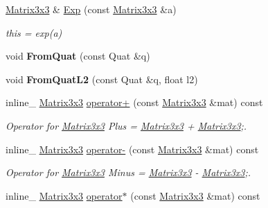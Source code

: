 \begin{DoxyCompactItemize}
\item 
\hypertarget{class_matrix3x3_a89f097e8a6c046d9b2a7c364f9a6dfbe}{\hyperlink{class_matrix3x3}{Matrix3x3} \& \hyperlink{class_matrix3x3_a89f097e8a6c046d9b2a7c364f9a6dfbe}{Exp} (const \hyperlink{class_matrix3x3}{Matrix3x3} \&a)}\label{class_matrix3x3_a89f097e8a6c046d9b2a7c364f9a6dfbe}

\begin{DoxyCompactList}\small\item\em this = exp(a) \end{DoxyCompactList}\item 
\hypertarget{class_matrix3x3_a89ea8a63ebc11e945fafdd9c761dcbb3}{void {\bfseries From\+Quat} (const Quat \&q)}\label{class_matrix3x3_a89ea8a63ebc11e945fafdd9c761dcbb3}

\item 
\hypertarget{class_matrix3x3_a9b951696a009332ac91d8ec6c5097dc3}{void {\bfseries From\+Quat\+L2} (const Quat \&q, float l2)}\label{class_matrix3x3_a9b951696a009332ac91d8ec6c5097dc3}

\item 
\hypertarget{class_matrix3x3_a90ffab5eff83c9f3a65552a84d85b316}{inline\+\_\+ \hyperlink{class_matrix3x3}{Matrix3x3} \hyperlink{class_matrix3x3_a90ffab5eff83c9f3a65552a84d85b316}{operator+} (const \hyperlink{class_matrix3x3}{Matrix3x3} \&mat) const }\label{class_matrix3x3_a90ffab5eff83c9f3a65552a84d85b316}

\begin{DoxyCompactList}\small\item\em Operator for \hyperlink{class_matrix3x3}{Matrix3x3} Plus = \hyperlink{class_matrix3x3}{Matrix3x3} + \hyperlink{class_matrix3x3}{Matrix3x3};. \end{DoxyCompactList}\item 
\hypertarget{class_matrix3x3_a8e29e6a7f65275594aec4fb1f542f2ba}{inline\+\_\+ \hyperlink{class_matrix3x3}{Matrix3x3} \hyperlink{class_matrix3x3_a8e29e6a7f65275594aec4fb1f542f2ba}{operator-\/} (const \hyperlink{class_matrix3x3}{Matrix3x3} \&mat) const }\label{class_matrix3x3_a8e29e6a7f65275594aec4fb1f542f2ba}

\begin{DoxyCompactList}\small\item\em Operator for \hyperlink{class_matrix3x3}{Matrix3x3} Minus = \hyperlink{class_matrix3x3}{Matrix3x3} -\/ \hyperlink{class_matrix3x3}{Matrix3x3};. \end{DoxyCompactList}\item 
\hypertarget{class_matrix3x3_a5986f5b597c6cb501ff839f54ed8a701}{inline\+\_\+ \hyperlink{class_matrix3x3}{Matrix3x3} \hyperlink{class_matrix3x3_a5986f5b597c6cb501ff839f54ed8a701}{operator$\ast$} (const \hyperlink{class_matrix3x3}{Matrix3x3} \&mat) const }\label{class_matrix3x3_a5986f5b597c6cb501ff839f54ed8a701}


\end{DoxyCompactItemize}

